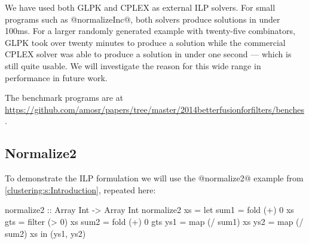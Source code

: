 We have used both GLPK and CPLEX as external ILP solvers. For small programs such as @normalizeInc@, both solvers produce solutions in under 100ms. For a larger randomly generated example with twenty-five combinators, GLPK took over twenty minutes to produce a solution while the commercial CPLEX solver was able to produce a solution in under one second --- which is still quite usable. We will investigate the reason for this wide range in performance in future work.


The benchmark programs are at \url{https://github.com/amosr/papers/tree/master/2014betterfusionforfilters/benches}.



\pagebreak
\subsection{Normalize2}
To demonstrate the ILP formulation we will use the @normalize2@ example from \autoref{clustering:s:Introduction}, repeated here:
\begin{code}
  normalize2 :: Array Int -> Array Int
  normalize2 xs
   = let sum1 = fold   (+)  0   xs
         gts  = filter (>   0)  xs
         sum2 = fold   (+)  0   gts
         ys1  = map    (/ sum1) xs
         ys2  = map    (/ sum2) xs
     in (ys1, ys2)
\end{code}


